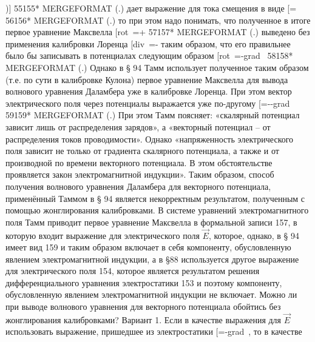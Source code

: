 \documentclass[11pt]{article}
\begin{document}
 \right){]}
55155* MERGEFORMAT (.) дает выражение для тока смещения в виде
{[}{{}\emph{{}}=\frac{\partial \overrightarrow{D}}{\partial t}{]}
56156* MERGEFORMAT (.) то при этом надо понимать, что полученное в итоге
первое уравнение Максвелла
{[}rot~=+\frac{\partial \overrightarrow{E}}{\partial t}{]}
57157* MERGEFORMAT (.) выведено без применения калибровки Лоренца
{[}div~=-\frac{\partial \varphi }{\partial t}{]}
таким образом, что его правильнее было бы записывать в потенциалах
следующим образом
{[}rot~=-grad~\varphi {]}
58158* MERGEFORMAT (.) Однако в § 94 Тамм использует полученное таким
образом (т.е. по сути в калибровке Кулона) первое уравнение Максвелла
для вывода волнового уравнения Даламбера уже в калибровке Лоренца. При
этом вектор электрического поля через потенциалы выражается уже
по-другому
{[}=--grad~\varphi {]}
59159* MERGEFORMAT (.) При этом Тамм поясняет: «скалярный потенциал
зависит лишь от распределения зарядов», а «векторный потенциал -- от
распределения токов проводимости». Однако «напряженность электрического
поля зависит не только от градиента скалярного потенциала, а также и от
производной по времени векторного потенциала. В этом обстоятельстве
проявляется закон электромагнитной индукции». Таким образом, способ
получения волнового уравнения Даламбера для векторного потенциала,
применённый Таммом в § 94 является некорректным результатом, полученным
с помощью жонглирования калибровками. В системе уравнений
электромагнитного поля Тамм приводит первое уравнение Максвелла в
формальной записи 157, в которую входит выражение для электрического
поля \(\overrightarrow{E}\), которое, однако, в § 94 имеет вид 159 и
таким образом включает в себя компоненту, обусловленную явлением
электромагнитной индукции, а в §88 используется другое выражение для
электрического поля 154, которое является результатом решения
дифференциального уравнения электростатики 153 и поэтому компоненту,
обусловленную явлением электромагнитной индукции не включает. Можно ли
при выводе волнового уравнения для векторного потенциала обойтись без
жонглирования калибровками? Вариант 1. Если в качестве выражения для
\(\overrightarrow{E}\) использовать выражение, пришедшее из
электростатики {[}=-grad~\varphi {]}, то в качестве
}
\end{document}
